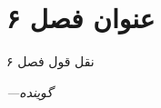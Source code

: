 \chapter{عنوان فصل ۶}
\setlength{\epigraphwidth}{0.45\textwidth}
\epigraph{نقل قول فصل ۶}{\textit{—گوینده}}
\setcounter{footnote}{0}
